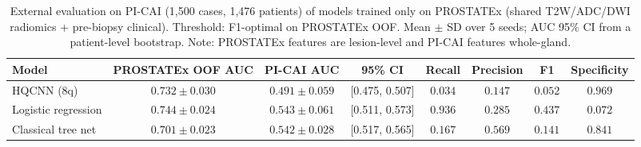 \begin{table}[t]
\centering
\caption{External evaluation on PI-CAI (1,500 cases, 1,476 patients) of models trained only on PROSTATEx (shared T2W/ADC/DWI radiomics + pre-biopsy clinical). Threshold: F1-optimal on PROSTATEx OOF. Mean $\pm$ SD over 5 seeds; AUC 95\% CI from a patient-level bootstrap. Note: PROSTATEx features are lesion-level and PI-CAI features whole-gland.}
\label{tab:v3_picai}
\small
\begin{tabular}{lccccccc}
\toprule
Model & PROSTATEx OOF AUC & PI-CAI AUC & 95\% CI & Recall & Precision & F1 & Specificity \\
\midrule
HQCNN (8q) & $0.732 \pm 0.030$ & $0.491 \pm 0.059$ & [0.475, 0.507] & $0.034$ & $0.147$ & $0.052$ & $0.969$ \\
Logistic regression & $0.744 \pm 0.024$ & $0.543 \pm 0.061$ & [0.511, 0.573] & $0.936$ & $0.285$ & $0.437$ & $0.072$ \\
Classical tree net & $0.701 \pm 0.023$ & $0.542 \pm 0.028$ & [0.517, 0.565] & $0.167$ & $0.569$ & $0.141$ & $0.841$ \\
\bottomrule
\end{tabular}
\end{table}
